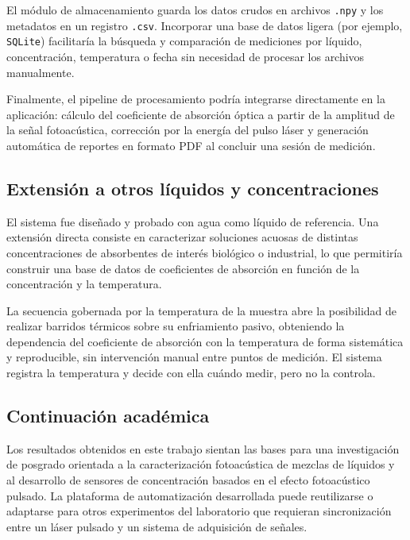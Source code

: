 El módulo de almacenamiento guarda los datos crudos en archivos
\texttt{.npy} y los metadatos en un registro \texttt{.csv}.
Incorporar una base de datos ligera (por ejemplo, \texttt{SQLite})
facilitaría la búsqueda y comparación de mediciones por líquido,
concentración, temperatura o fecha sin necesidad de procesar los
archivos manualmente.

Finalmente, el pipeline de procesamiento podría integrarse
directamente en la aplicación: cálculo del coeficiente de absorción
óptica a partir de la amplitud de la señal fotoacústica, corrección
por la energía del pulso láser y generación automática de reportes
en formato PDF al concluir una sesión de medición.

\subsection*{Extensión a otros líquidos y concentraciones}

El sistema fue diseñado y probado con agua como líquido de
referencia. Una extensión directa consiste en caracterizar
soluciones acuosas de distintas concentraciones de absorbentes
de interés biológico o industrial, lo que permitiría construir
una base de datos de coeficientes de absorción en función de la
concentración y la temperatura.

La secuencia gobernada por la temperatura de la muestra abre la
posibilidad de realizar barridos térmicos sobre su enfriamiento pasivo,
obteniendo la dependencia del coeficiente de absorción con la
temperatura de forma sistemática y reproducible, sin intervención
manual entre puntos de medición. El sistema registra la temperatura y
decide con ella cuándo medir, pero no la controla.

\subsection*{Continuación académica}

Los resultados obtenidos en este trabajo sientan las bases para
una investigación de posgrado orientada a la caracterización
fotoacústica de mezclas de líquidos y al desarrollo de sensores
de concentración basados en el efecto fotoacústico pulsado.
La plataforma de automatización desarrollada puede reutilizarse
o adaptarse para otros experimentos del laboratorio que requieran
sincronización entre un láser pulsado y un sistema de adquisición
de señales.
